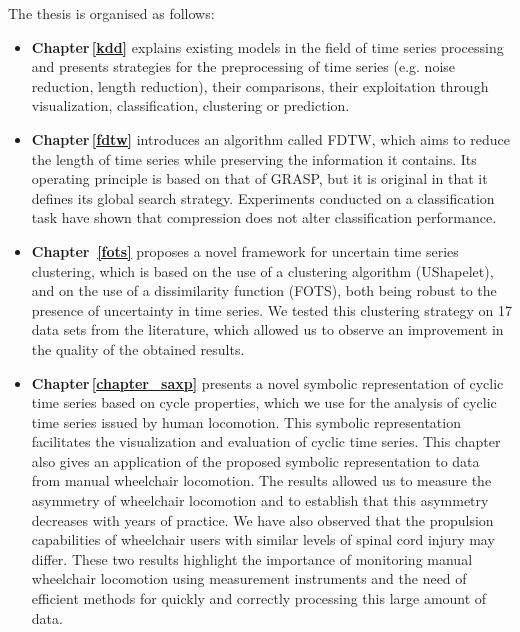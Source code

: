 The thesis is organised as follows:
\begin{itemize}


\item \textbf{Chapter\,\ref{kdd}} explains existing models in the field of time series processing and presents strategies for the preprocessing of time series (e.g. noise reduction, length reduction), their comparisons, their exploitation through visualization, classification, clustering or prediction.
 
 
\item \textbf{Chapter\,\ref{fdtw}} introduces an algorithm called FDTW, which aims to reduce the length of time series while preserving the information it contains. Its operating principle is based on that of GRASP, but it is original in that it defines its global search strategy. Experiments conducted on a classification task have shown that compression does not alter classification performance. 

\item \textbf{Chapter\, \ref{fots}} proposes a novel framework for uncertain time series clustering, which is based on the use of a clustering algorithm (UShapelet), and on the use of a dissimilarity function (FOTS),  both being robust to the presence of uncertainty in time series. We tested this clustering strategy on 17 data sets from the literature, which allowed us to observe an improvement in the quality of the obtained results.


\item \textbf{Chapter\,\ref{chapter_saxp}} presents a novel symbolic representation of cyclic time series based on cycle properties, which we use for the analysis of cyclic time series issued by human locomotion. This symbolic representation  facilitates the visualization and evaluation of cyclic time series. This chapter also gives an application of the proposed symbolic representation to data from manual wheelchair locomotion. The results allowed us to measure the asymmetry of wheelchair locomotion and to establish that this asymmetry decreases with years of practice. We have also observed that the propulsion capabilities of wheelchair users with similar levels of spinal cord injury may differ. These  two results highlight the importance of monitoring manual wheelchair locomotion using measurement instruments and the need of efficient methods for quickly and correctly processing this large amount of data.  

\end{itemize}


